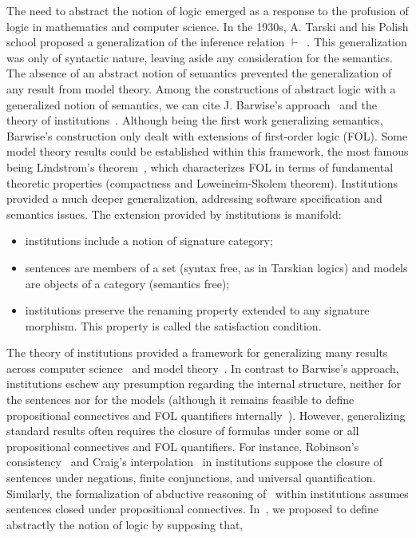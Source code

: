 \documentclass[preprint,3p,times]{elsarticle}
\begin{document}
The need to abstract the notion of logic emerged as a response to the profusion of logic in mathematics and computer science. In the 1930s, A. Tarski and his Polish school proposed a generalization of the inference relation $\vdash$~\cite{Tar56}. 
This generalization was only of syntactic nature, leaving aside any consideration for the semantics. The absence of an abstract notion of semantics prevented the generalization of any result from model theory. Among the constructions of abstract logic with a generalized notion of semantics, we can cite J. Barwise's approach~\cite{Bar74} and the theory of institutions~\cite{GB92}. Although being the first work generalizing semantics, Barwise's construction only dealt with extensions of first-order logic (FOL). Some model theory results could be established within this framework, the most famous being Lindstrom's theorem~\cite{Lin69}, which characterizes FOL in terms of fundamental theoretic properties (compactness and Loweineim-Skolem theorem). Institutions provided a much deeper generalization, addressing software specification and semantics issues. The extension provided by institutions is manifold:

\begin{itemize}
	\item institutions include a notion of signature category;
	\item sentences are members of a set (syntax free, as in Tarskian logics) and models are objects of a category (semantics free);
	\item institutions preserve the renaming property extended to any signature morphism. This property is called the satisfaction condition.
\end{itemize}

The theory of institutions provided a framework for generalizing many results across computer science~\cite{MA:AIJ-18,MA:IJAR-18,AB19,Bor02,Tar99} and model theory~\cite{AD07,Dia08,GP10,GP07}. In contrast to Barwise's approach, institutions eschew any presumption regarding the internal structure, neither for the sentences nor for the models (although it remains feasible to define propositional connectives and FOL quantifiers internally~\cite{Dia08}). However, generalizing standard results often requires the closure of formulas under some or all propositional connectives and FOL quantifiers. For instance, Robinson's consistency~\cite{GP07} and Craig's interpolation~\cite{Dia04} in institutions suppose the closure of sentences under negations, finite conjunctions, and universal quantification. Similarly, the formalization of abductive reasoning of~\cite{MA:IJAR-18} within institutions assumes sentences closed under propositional connectives. In~\cite{AB23}, we proposed to define abstractly the notion of logic by supposing that, 
\end{document}
